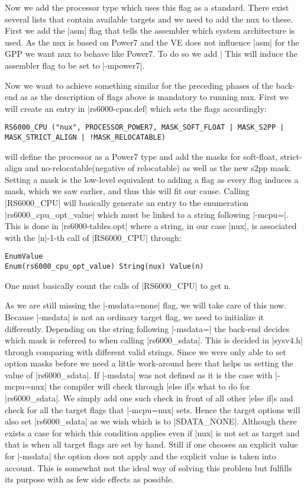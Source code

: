 Now we add the processor type which uses this flag as a standard.
There exist several lists that contain available targets and we need to add the nux to these.
First we add the |asm| flag that tells the assembler which system architecture is used.
As the nux is based on Power7 and the VE does not influence |asm| for the GPP we want nux to behave like Power7.
To do so we add |%
This will induce the assembler flag to be set to |-mpower7|.

Now we want to achieve something similar for the preceding phases of the back-end as as the description of flags above is mandatory to running nux.
First we will create an entry in |rs6000-cpus.def| which sets the flags accordingly:
\begin{lstlisting}
RS6000_CPU ("nux", PROCESSOR_POWER7, MASK_SOFT_FLOAT | MASK_S2PP | MASK_STRICT_ALIGN | !MASK_RELOCATABLE)
\end{lstlisting}
will define the processor as a Power7 type and add the masks for soft-float, strict-align and no-relocatable(negative of relocatable) as well as the new s2pp mask.
Setting a mask is the low-level equivalent to adding a flag as every flag induces a mask, which we saw earlier, and thus this will fit our cause.
Calling |RS6000_CPU| will basically generate an entry to the enumeration |rs6000_cpu_opt_value| which must be linked to a string following |-mcpu=|.
This is done in |rs6000-tables.opt| where a string, in our case |nux|, is associated with the |n|-1-th call of |RS6000_CPU| through:
\begin{lstlisting}
EnumValue
Enum(rs6000_cpu_opt_value) String(nux) Value(n)
\end{lstlisting}
One must basically count the calls of |RS6000_CPU| to get n.

As we are still missing the |-msdata=none| flag, we will take care of this now.
Because |-msdata| is not an ordinary target flag, we need to initialize it differently.
Depending on the string following |-msdata=| the back-end decides which mask is referred to when calling |rs6000_sdata|.
This is decided in |sysv4.h| through comparing with different valid strings.
Since we were only able to set option masks before we need a little work-around here that helps us setting the value of |rs6000_sdata|.
If |-msdata| was not defined as it is the case with |-mcpu=nux| the compiler will check through |else if|s what to do for |rs6000_sdata|.
We simply add one such check in front of all other |else if|s and check for all the target flags that |-mcpu=nux| sets.
Hence the target options will also set |rs6000_sdata| as we wish which is to |SDATA_NONE|.
Although there exists a case for which this condition applies even if |nux| is not set as target and that is when all target flags are set by hand.
Still if one chooses an explicit value for |-msdata| the option does not apply and the explicit value is taken into account.
This is somewhat not the ideal way of solving this problem but fulfills its purpose with as few side effects as possible.


